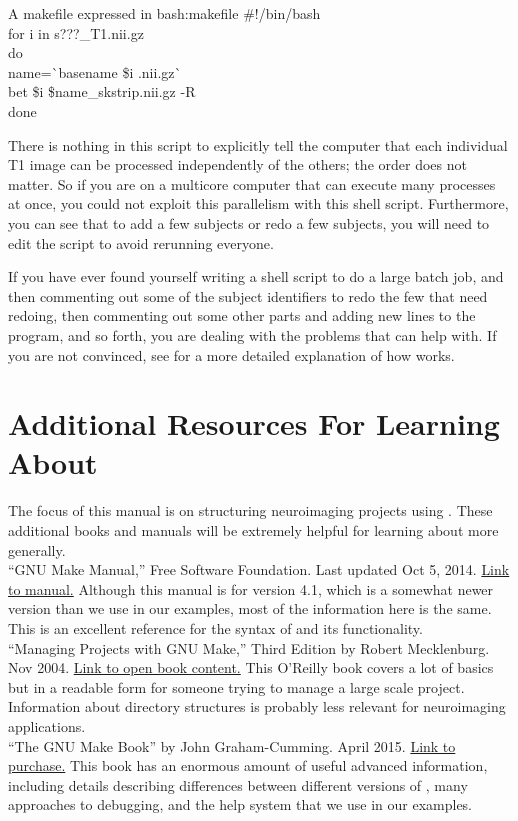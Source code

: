\begin{bash}{A makefile expressed in \bashn{}}{bash:makefile}
	\#!/bin/bash \\
	for i in s???_T1.nii.gz \\
	do \\
	name=\`{}basename \$i .nii.gz\`{} \\
	bet \$i \${name}_skstrip.nii.gz -R \\
	done
\end{bash}
	
There is nothing in this script to explicitly tell the computer that each individual T1 image can be processed independently of the others; the order does not matter. So if you are on a multicore computer that can execute many processes at once, you could not exploit this parallelism with this shell script. Furthermore, you can see that to add a few subjects or redo a few subjects, you will need to edit the script to avoid rerunning everyone. 
	
If you have ever found yourself writing a shell script to do a large batch job, and then commenting out some of the subject identifiers to redo the few that need redoing, then commenting out some other parts and adding new lines to the program, and so forth, you are dealing with the problems that \maken{} can help with. If you are not convinced, see  for a more detailed explanation of how \maken{} works. 

\section{Additional Resources For Learning About \maken{}}
The focus of this manual is on structuring neuroimaging projects using \maken{}. These additional books and manuals will be extremely helpful for learning about \maken{} more generally. \\

``GNU Make Manual,'' Free Software Foundation. Last updated Oct 5, 2014. \href{http://www.gnu.org/software/make/manual/}{Link to manual.} Although this manual is for version 4.1, which is a somewhat newer version than we use in our examples, most of the information here is the same. This is an excellent reference for the syntax of \maken{} and its functionality. 
\\

``Managing Projects with GNU Make,'' Third Edition by Robert Mecklenburg. Nov 2004. \href{http://www.oreilly.com/openbook/make3/book/index.csp}{Link to open book content.} This O'Reilly book covers a lot of basics but in a readable form for someone trying to manage a large scale project. Information about directory structures is probably less relevant for neuroimaging applications. 
\\

``The GNU Make Book'' by John Graham-Cumming. April 2015. \href{https://www.nostarch.com/gnumake}{Link to purchase.} This book has an enormous amount of useful advanced information, including details describing differences between different versions of \maken{}, many approaches to debugging, and the help system that we use in our examples. 
